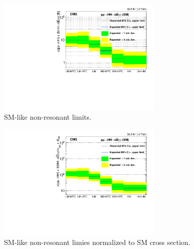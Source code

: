 \begin{figure}[thb]
  \centering
  \includegraphics[width=0.7\textwidth]{figures/sec-results/NonResSMCats.pdf}\hfil
  \caption{SM-like non-resonant limits.}
  \label{fig:nonres}
\end{figure}

\begin{figure}[thb]
  \centering
  \includegraphics[width=0.7\textwidth]{figures/sec-results/NonResSMCats_SM.pdf}\hfil
  \caption{SM-like non-resonant limies normalized to SM cross section.}
  \label{fig:nonres_norm}
\end{figure}
